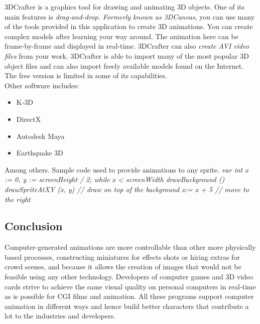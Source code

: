 \documentclass[12pt,a4paper]{article}
\begin{document}
3DCrafter is a graphics tool for drawing and animating 3D objects. One of its main features is \textit{drag-and-drop. Formerly known as 3DCanvas}, you can use many of the tools provided in this application to create 3D animations. You can create complex models after learning your way around. The animation here can be frame-by-frame and displayed in real-time. 3DCrafter can also\textit{ create AVI video files} from your work. 3DCrafter is able to import many of the most popular 3D object files and can also import freely available models found on the Internet. The free version is limited in some of its capabilities.
\\
Other software includes:
\begin{itemize}
\item K-3D
\item DirectX
\item Autodesk Maya
\item Earthquake 3D
\end{itemize}
Among others.
Sample code used to provide animations to any sprite.
\emph{var int x := 0, y := 
screenHeight / 2; 
while x < screenWidth 
drawBackground () drawSpriteAtXY (x, y) // draw on top of the background 
x:= x + 5 // move to the right
}
\begin{center}
\section*{Conclusion}
\end{center}
Computer-generated animations are more controllable than other more physically based processes, constructing miniatures for effects shots or hiring extras for crowd scenes, and because it allows the creation of images that would not be feasible using any other technology.
Developers of computer games and 3D video cards strive to achieve the same visual quality on personal computers in real-time as is possible for CGI films and animation.
All these programs support computer animation in different ways and hence build better characters that contribute a lot to the industries and developers.
\end{document}
